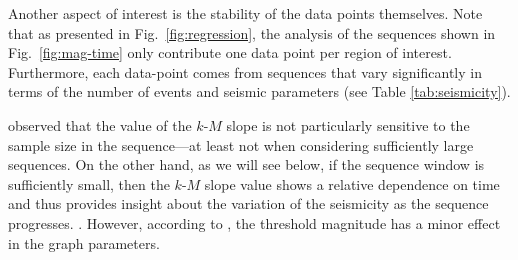 Another aspect of interest is the stability of the data points themselves. Note that as presented in Fig.~\ref{fig:regression}, the analysis of the sequences shown in Fig.~\ref{fig:mag-time} only contribute one data point per region of interest. Furthermore, each data-point comes from sequences that vary significantly in terms of the number of events and seismic parameters (see Table \ref{tab:seismicity}). 

\citet{Telesca2013} observed that the value of the $k$-$M$ slope is not particularly sensitive to the sample size in the sequence---at least not when considering sufficiently large sequences. On the other hand, as we will see below, if the sequence window is sufficiently small, then the $k$-$M$ slope value shows a relative dependence on time and thus provides insight about the variation of the seismicity as the sequence progresses.  . However, according to \citet{Telesca2012}, the threshold magnitude has a minor effect in the graph parameters.

